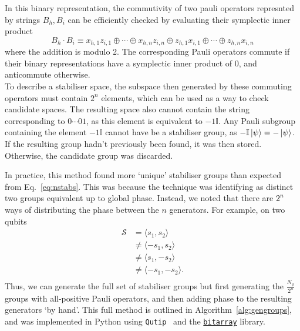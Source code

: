 \documentclass{standalone}
\begin{document}
In this binary representation, the commutivity of two pauli operators represnted by strings $B_{h},B_{i}$ can be efficiently checked by evaluating their symplectic inner product
\begin{equation}\label{eq:sympprod}
    B_{h}\cdot B_{i} \equiv x_{h,1}z_{i,1}\oplus\cdots\oplus x_{h,n}z_{i,n}\oplus z_{h,1}x_{i,1}\oplus\cdots\oplus z_{h,n}x_{i,n}
\end{equation}
where the addition is modulo 2. The corresponding Pauli operators commute if their binary representations have a symplectic inner product of $0$, and anticommute otherwise.\\
To describe a stabiliser space, the subspace then generated by these commuting operators must contain $2^{n}$ elements, which can be used as a way to check candidate spaces. The resulting space also cannot contain the string corresponding to $0\cdots01$, as this element is equivalent to $-1\mathbb{I}$. Any Pauli subgroup containing the element $-1\mathbb{I}$ cannot have be a stabiliser group, as $-\mathbb{I}\ket{\psi}=-\ket{\psi}$. \\
If the resulting group hadn't previously been found, it was then stored. Otherwise, the candidate group was discarded.
\par
In practice, this method found more `unique' stabiliser groups than expected from Eq.~\ref{eq:nstabs}. This was because the technique was identifying as distinct two groups equivalent up to global phase. Instead, we noted that there are $2^{n}$ ways of distributing the phase between the $n$ generators. For example, on two qubits
\begin{align*}
    \mathcal{S}&=\langle s_{1},s_{2}\rangle \\
    &\neq \langle -s_{1},s_{2}\rangle \\
    &\neq \langle s_{1},-s_{2}\rangle \\
    &\neq \langle -s_{1},-s_{2}\rangle. \\
\end{align*}
Thus, we can generate the full set of stabiliser groups but first generating the $\frac{N_{\phi}}{2^{n}}$ groups with all-positive Pauli operators, and then adding phase to the resulting generators `by hand'. This full method is outlined in Algorithm~\ref{alg:gengroups}, and was implemented in Python using \texttt{Qutip}~\cite{Johansson2012} and the \href{https://github.com/ilanschnell/bitarray}{\texttt{bitarray}} library.
\end{document}
